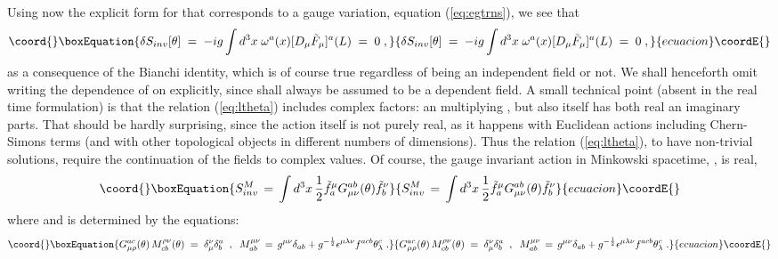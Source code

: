 \documentclass[a4paper,12pt]{article}
\begin{document}
Using now the explicit form for \myHighlight{$\delta\theta_\mu$}\coordHE{} that corresponds to
a gauge variation, equation (\ref{eq:egtrns}), we see that
\begin{equation}\coord{}\boxEquation{
\delta S_{inv}[\theta] \;=\; - i g \int d^3x \; \omega^a (x)
[D_\mu {\tilde F}_\mu ]^a(L) \;=\;0 \;,
}{
\delta S_{inv}[\theta] \;=\; - i g \int d^3x \; \omega^a (x)
[D_\mu {\tilde F}_\mu ]^a(L) \;=\;0 \;,
}{ecuacion}\coordE{}\end{equation}
as a consequence of the Bianchi identity, which is of course true
regardless of \coordHE{} being an independent field or not. We shall
henceforth omit writing the dependence of \coordHE{} on \myHighlight{$\theta$}\coordHE{} explicitly,
since \coordHE{} shall always be assumed to be a dependent field.  A small
technical point (absent in the real time formulation) is that the
relation (\ref{eq:ltheta}) includes complex factors: an \coordHE{}
multiplying \coordHE{}, but also \coordHE{} itself has both real an imaginary parts.
That should be hardly surprising, since the action itself is not
purely real, as it happens with Euclidean actions including
Chern-Simons terms (and with other topological objects in different
numbers of dimensions).  Thus the relation (\ref{eq:ltheta}), to have
non-trivial solutions, require the continuation of the fields to
complex values.  Of course, the gauge invariant action in Minkowski
spacetime, \coordHE{}, is real,
\begin{equation}\coord{}\boxEquation{\label{eq:mink}
S_{inv}^M \,=\, \int d^3x \,\frac{1}{2} {\tilde f}^\mu_a
G_{\mu\nu}^{ab}(\theta){\tilde f}^\nu_b
}{S_{inv}^M \,=\, \int d^3x \,\frac{1}{2} {\tilde f}^\mu_a
G_{\mu\nu}^{ab}(\theta){\tilde f}^\nu_b
}{ecuacion}\coordE{}\end{equation}
where \coordHE{} and \coordHE{} is determined by
the equations:
\begin{equation}\coord{}\boxEquation{\label{eq:defgm}
G_{\mu\rho}^{ac}(\theta)\, M^{\rho\nu}_{cb}(\theta) \;=\;
\delta_\mu^\nu \delta^a_b 
\;\;,\;\;
M^{\mu\nu}_{ab}\,=\, g^{\mu\nu}\delta_{ab} +  g^{-\frac{1}{2}}
\epsilon^{\mu\lambda\nu} f^{acb} \theta_\lambda^c\;.
}{G_{\mu\rho}^{ac}(\theta)\, M^{\rho\nu}_{cb}(\theta) \;=\;
\delta_\mu^\nu \delta^a_b 
\;\;,\;\;
M^{\mu\nu}_{ab}\,=\, g^{\mu\nu}\delta_{ab} +  g^{-\frac{1}{2}}
\epsilon^{\mu\lambda\nu} f^{acb} \theta_\lambda^c\;.
}{ecuacion}\coordE{}\end{equation}
\end{document}

